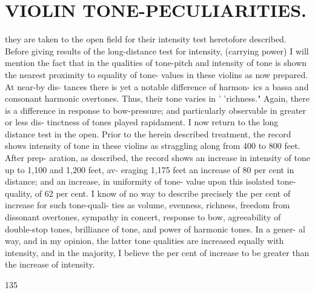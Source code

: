 \documentclass{article}
\begin{document}
\section*{VIOLIN TONE-PECULIARITIES.}
they are taken to the open field for their intensity test heretofore described. Before giving results of the long-distance test for intensity, (carrying power) I will mention the fact that in the qualities of tone-pitch and intensity of tone is shown the nearest proximity to equality of tone- values in these violins as now prepared. At near-by dis- tances there is yet a notable difference of harmon- ics a bassa and consonant harmonic overtones. Thus, their tone varies in ' 'richness." Again, there is a difference in response to bow-pressure; and particularly observable in greater or less dis- tinctness of tones played rapidament. I now return to the long distance test in the open. Prior to the herein described treatment, the record shows intensity of tone in these violins as straggling along from 400 to 800 feet. After prep- aration, as described, the record shows an increase in intensity of tone up to 1,100 and 1,200 feet, av- eraging 1,175 feet an increase of 80 per cent in distance; and an increase, in uniformity of tone- value upon this isolated tone-quality, of 62 per cent. I know of no way to describe precisely the per cent of increase for such tone-quali- ties as volume, evenness, richness, freedom from dissonant overtones, sympathy in concert, response to bow, agreeability of double-stop tones, brilliance of tone, and power of harmonic tones. In a gener- al way, and in my opinion, the latter tone qualities are increased equally with intensity, and in the majority, I believe the per cent of increase to be greater than the increase of intensity.

135
\end{document}
